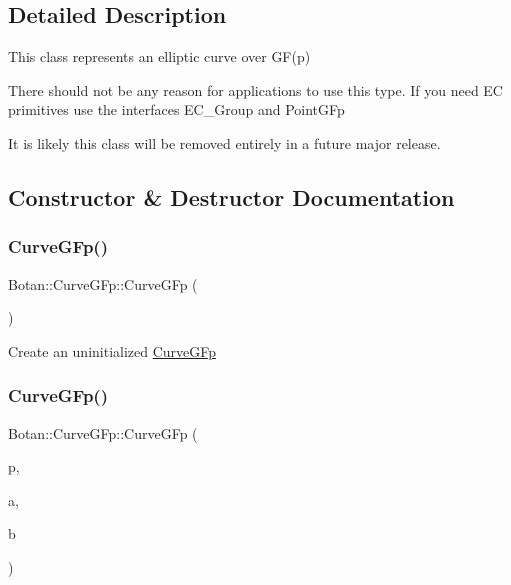 \subsection{Detailed Description}
This class represents an elliptic curve over G\+F(p)

There should not be any reason for applications to use this type. If you need EC primitives use the interfaces E\+C\+\_\+\+Group and Point\+G\+Fp

It is likely this class will be removed entirely in a future major release. 

\subsection{Constructor \& Destructor Documentation}
\mbox{\label{class_botan_1_1_curve_g_fp_aa040fce271ca5bcff4b19717aae958a2}} 
\subsubsection{\texorpdfstring{Curve\+G\+Fp()}{CurveGFp()}\hspace{0.1cm}{\footnotesize\ttfamily [1/2]}}
{\footnotesize\ttfamily Botan\+::\+Curve\+G\+Fp\+::\+Curve\+G\+Fp (\begin{DoxyParamCaption}{ }\end{DoxyParamCaption})\hspace{0.3cm}{\ttfamily [default]}}

Create an uninitialized \hyperlink{class_botan_1_1_curve_g_fp}{Curve\+G\+Fp} \mbox{\label{class_botan_1_1_curve_g_fp_aaeb72bf32cd4e5169be11094c244f92b}} 
\subsubsection{\texorpdfstring{Curve\+G\+Fp()}{CurveGFp()}\hspace{0.1cm}{\footnotesize\ttfamily [2/2]}}
{\footnotesize\ttfamily Botan\+::\+Curve\+G\+Fp\+::\+Curve\+G\+Fp (\begin{DoxyParamCaption}\item[{const Big\+Int \&}]{p,  }\item[{const Big\+Int \&}]{a,  }\item[{const Big\+Int \&}]{b }\end{DoxyParamCaption})\hspace{0.3cm}{\ttfamily [inline]}}

